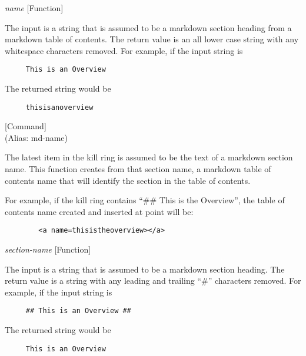 \vspace{1em}
\noindent
{}
\usebox{\funcname}\emph{name}
 \hfill [Function]

\begin{doc-string}
The input is a string that is assumed to be a markdown section heading from
a markdown table of contents.
The return value is an all lower case string with any whitespace characters
removed.
For example, if the input string is

\small{\begin{verbatim}
     This is an Overview
\end{verbatim}}

The returned string would be

\small{\begin{verbatim}
     thisisanoverview
\end{verbatim}}
\end{doc-string}

\vspace{1em}
\noindent
{}
\usebox{\funcname}
 \hfill [Command]\\%
 (Alias: md-name)

\begin{doc-string}
The latest item in the kill ring is assumed to be the text of a markdown
section name.  This function creates from that section name, a markdown table of
contents name that will identify the section in the table of contents.

For example, if the kill ring contains ``\#\# This is the Overview'', the table
of contents name created and inserted at point will be:

\small{\begin{verbatim}
        <a name=thisistheoverview></a>
\end{verbatim}}
\end{doc-string}

\vspace{1em}
\noindent
{}
\usebox{\funcname}\emph{section-name}
 \hfill [Function]

\begin{doc-string}
The input is a string that is assumed to be a markdown section heading.  The
return value is a string with any leading and trailing ``\#'' characters removed.
For example, if the input string is

\small{\begin{verbatim}
     ## This is an Overview ##
\end{verbatim}}

The returned string would be

\small{\begin{verbatim}
     This is an Overview
\end{verbatim}}
\end{doc-string}

